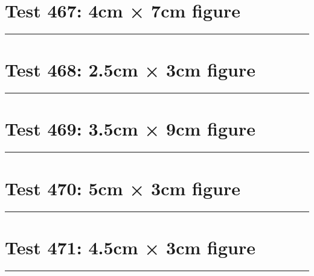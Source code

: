 \documentclass[a4paper,11pt]{article}
\begin{document}
\section*{Test 467: 4cm × 7cm figure}
\begin{swarmwrap}%
  \begin{minipage}[t]{4cm}
    \centering
    \rule{\linewidth}{7cm}
  \end{minipage}%
\end{swarmwrap}%
\swarmwrapnext
\lipsum[143]
\lipsum[144]
\lipsum[145]
\lipsum[146]
\lipsum[147]
\lipsum[148]
\section*{Test 468: 2.5cm × 3cm figure}
\begin{swarmwrap}%
  \begin{minipage}[t]{2cm}
    \centering
    \rule{\linewidth}{3cm}
  \end{minipage}%
\end{swarmwrap}%
\swarmwrapnext
\lipsum[81]
\lipsum[82]
\lipsum[83]
\section*{Test 469: 3.5cm × 9cm figure}
\begin{swarmwrap}%
  \begin{minipage}[t]{3cm}
    \centering
    \rule{\linewidth}{9cm}
  \end{minipage}%
\end{swarmwrap}%
\swarmwrapnext
\lipsum[106]
\lipsum[107]
\lipsum[108]
\lipsum[109]
\lipsum[110]
\lipsum[111]
\section*{Test 470: 5cm × 3cm figure}
\begin{swarmwrap}%
  \begin{minipage}[t]{5cm}
    \centering
    \rule{\linewidth}{3cm}
  \end{minipage}%
\end{swarmwrap}%
\swarmwrapnext
\lipsum[83]
\lipsum[84]
\lipsum[85]
\lipsum[86]
\section*{Test 471: 4.5cm × 3cm figure}
\begin{swarmwrap}%
  \begin{minipage}[t]{4cm}
    \centering
    \rule{\linewidth}{3cm}
  \end{minipage}%
\end{swarmwrap}%
\swarmwrapnext
\lipsum[121]
\lipsum[122]
\lipsum[123]
\lipsum[124]
\lipsum[125]
\lipsum[126]
\end{document}
